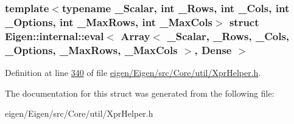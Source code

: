 \subsubsection*{template$<$typename \+\_\+\+Scalar, int \+\_\+\+Rows, int \+\_\+\+Cols, int \+\_\+\+Options, int \+\_\+\+Max\+Rows, int \+\_\+\+Max\+Cols$>$\newline
struct Eigen\+::internal\+::eval$<$ Array$<$ \+\_\+\+Scalar, \+\_\+\+Rows, \+\_\+\+Cols, \+\_\+\+Options, \+\_\+\+Max\+Rows, \+\_\+\+Max\+Cols $>$, Dense $>$}



Definition at line \hyperlink{eigen_2_eigen_2src_2_core_2util_2_xpr_helper_8h_source_l00340}{340} of file \hyperlink{eigen_2_eigen_2src_2_core_2util_2_xpr_helper_8h_source}{eigen/\+Eigen/src/\+Core/util/\+Xpr\+Helper.\+h}.



The documentation for this struct was generated from the following file\+:\begin{DoxyCompactItemize}
\item 
eigen/\+Eigen/src/\+Core/util/\+Xpr\+Helper.\+h\end{DoxyCompactItemize}
